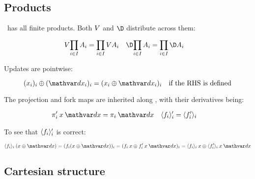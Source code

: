 

\subsection{Products}
\label{sec:CP-products}

\CP\ has all finite products. Both $V$ and $\chgfn$ distribute across
them:

\nopagebreak[2]
\begin{align*}
  \vals{\prod_{i \in I} A_i} &= \prod_{i \in I} \vals A_i &
  \chgs{\prod_{i \in I} A_i} &= \prod_{i \in I} \chgs A_i
\end{align*}

\noindent
Updates are pointwise:

\nopagebreak[2]
\[ (x_i)_i \upd (\dx_i)_i = (x_i \upd \dx_i)_i
\quad\text{if the RHS is defined}\]

\noindent
The projection and fork maps are inherited along \valfn, with their derivatives
being:

\nopagebreak[2]
\begin{align*}
  \deriv\pi_i\<x\<\dx &= \pi_i\<\dx &
  \deriv{\fork{f_i}_i} &= \fork{\deriv f_i}_i
\end{align*}

\noindent
{}
To see that $\langle{f_i}\rangle_i'$ is correct:

\nopagebreak[2]
\begin{equation*}
  \fork{f_i}_i \<(x \upd \dx)
  = (f_i(x \upd \dx))_i
  = (f_i\<x \upd \deriv f_i \<x \<\dx)_i
  = \fork{f_i}_i \<x \upd \fork{\deriv f_i}_i \<x \<\dx
\end{equation*}

\noindent
{}


\subsection{Cartesian structure}
\label{sec:CP-cartesian}

